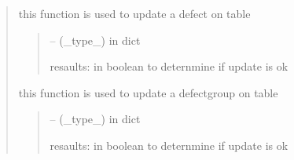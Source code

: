 \documentclass[letterpaper,10pt,english]{sphinxmanual}
\begin{document}
\begin{quote}
\begin{savenotes}
\begin{fulllineitems}
\begin{savenotes}\begin{fulllineitems}
\label{\detokenize{setting/database_utils:oxin.database_utils.dataBaseUtils.update_defect}}
\pysigstartsignatures
{}
\pysigstopsignatures
\sphinxAtStartPar
this function is used to update a defect on table
\begin{quote}\begin{description}
\sphinxAtStartPar
{} – (\_type\_) in dict

\sphinxAtStartPar
resaults: in boolean to deternmine if update is ok

\end{description}\end{quote}

\end{fulllineitems}\end{savenotes}


\begin{savenotes}\begin{fulllineitems}
\label{\detokenize{setting/database_utils:oxin.database_utils.dataBaseUtils.update_defect_group}}
\pysigstartsignatures
{}
\pysigstopsignatures
\sphinxAtStartPar
this function is used to update a defect\sphinxhyphen{}group on table
\begin{quote}\begin{description}
\sphinxAtStartPar
{} – (\_type\_) in dict

\sphinxAtStartPar
resaults: in boolean to deternmine if update is ok

\end{description}\end{quote}

\end{fulllineitems}\end{savenotes}



\end{fulllineitems}
\end{savenotes}
\end{quote}
\end{document}
